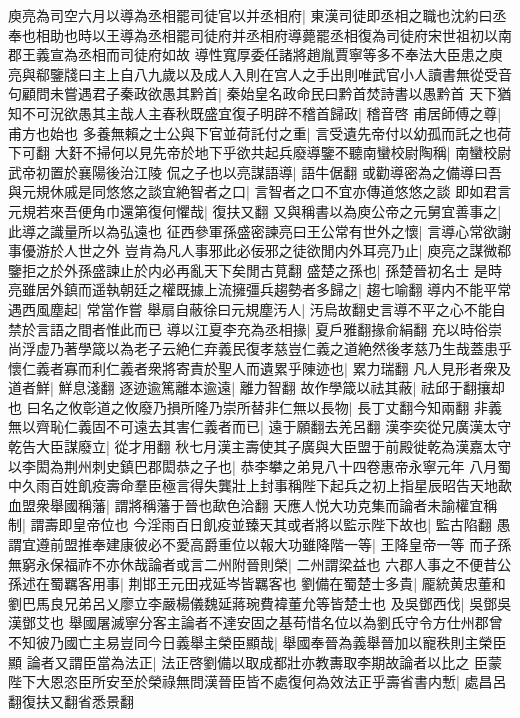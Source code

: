 庾亮為司空六月以導為丞相罷司徒官以并丞相府|{
	東漢司徒即丞相之職也沈約曰丞奉也相助也時以王導為丞相罷司徒府并丞相府導薨罷丞相復為司徒府宋世祖初以南郡王義宣為丞相而司徒府如故}
導性寬厚委任諸將趙胤賈寧等多不奉法大臣患之庾亮與郗鑒牋曰主上自八九歲以及成人入則在宫人之手出則唯武官小人讀書無從受音句顧問未嘗遇君子秦政欲愚其黔首|{
	秦始皇名政命民曰黔首焚詩書以愚黔首}
天下猶知不可況欲愚其主哉人主春秋既盛宜復子明辟不稽首歸政|{
	稽音啓}
甫居師傅之尊|{
	甫方也始也}
多養無賴之士公與下官並荷託付之重|{
	言受遺先帝付以幼孤而託之也荷下可翻}
大姧不掃何以見先帝於地下乎欲共起兵廢導鑒不聽南蠻校尉陶稱|{
	南蠻校尉武帝初置於襄陽後治江陵}
侃之子也以亮謀語導|{
	語牛倨翻}
或勸導密為之備導曰吾與元規休戚是同悠悠之談宜絶智者之口|{
	言智者之口不宜亦傳道悠悠之談}
即如君言元規若來吾便角巾還第復何懼哉|{
	復扶又翻}
又與稱書以為庾公帝之元舅宜善事之|{
	此導之識量所以為弘遠也}
征西參軍孫盛密諫亮曰王公常有世外之懷|{
	言導心常欲謝事優游於人世之外}
豈肯為凡人事邪此必佞邪之徒欲閒内外耳亮乃止|{
	庾亮之謀微郗鑒拒之於外孫盛諫止於内必再亂天下矣閒古莧翻}
盛楚之孫也|{
	孫楚晉初名士}
是時亮雖居外鎮而遥執朝廷之權既據上流擁彊兵趨勢者多歸之|{
	趨七喻翻}
導内不能平常遇西風塵起|{
	常當作嘗}
舉扇自蔽徐曰元規塵汚人|{
	汚烏故翻史言導不平之心不能自禁於言語之間者惟此而已}
導以江夏李充為丞相掾|{
	夏戶雅翻掾俞絹翻}
充以時俗崇尚浮虚乃著學箴以為老子云絶仁弃義民復孝慈豈仁義之道絶然後孝慈乃生哉蓋患乎懷仁義者寡而利仁義者衆將寄責於聖人而遺累乎陳迹也|{
	累力瑞翻}
凡人見形者衆及道者鮮|{
	鮮息淺翻}
逐迹逾篤離本逾遠|{
	離力智翻}
故作學箴以祛其蔽|{
	祛邱于翻攘却也}
曰名之攸彰道之攸廢乃損所隆乃崇所替非仁無以長物|{
	長丁丈翻今知兩翻}
非義無以齊恥仁義固不可遠去其害仁義者而已|{
	遠于願翻去羌呂翻}
漢李奕從兄廣漢太守乾告大臣謀廢立|{
	從才用翻}
秋七月漢主壽使其子廣與大臣盟于前殿徙乾為漢嘉太守以李閎為荆州刺史鎮巴郡閎恭之子也|{
	恭李攀之弟見八十四卷惠帝永寧元年}
八月蜀中久雨百姓飢疫壽命羣臣極言得失龔壯上封事稱陛下起兵之初上指星辰昭告天地歃血盟衆舉國稱藩|{
	謂將稱藩于晉也歃色洽翻}
天應人悦大功克集而論者未諭權宜稱制|{
	謂壽即皇帝位也}
今淫雨百日飢疫並臻天其或者將以監示陛下故也|{
	監古陷翻}
愚謂宜遵前盟推奉建康彼必不愛高爵重位以報大功雖降階一等|{
	王降皇帝一等}
而子孫無窮永保福祚不亦休哉論者或言二州附晉則榮|{
	二州謂梁益也}
六郡人事之不便昔公孫述在蜀羈客用事|{
	荆邯王元田戎延岑皆羈客也}
劉備在蜀楚士多貴|{
	龎統黄忠董和劉巴馬良兄弟呂乂廖立李嚴楊儀魏延蔣琬費褘董允等皆楚士也}
及吳鄧西伐|{
	吳鄧吳漢鄧艾也}
舉國屠滅寧分客主論者不達安固之基苟惜名位以為劉氏守令方仕州郡曾不知彼乃國亡主易豈同今日義舉主榮臣顯哉|{
	舉國奉晉為義舉晉加以寵秩則主榮臣顯}
論者又謂臣當為法正|{
	法正啓劉備以取成都壯亦教夀取李期故論者以比之}
臣蒙陛下大恩恣臣所安至於榮祿無問漢晉臣皆不處復何為效法正乎壽省書内慙|{
	處昌呂翻復扶又翻省悉景翻}
